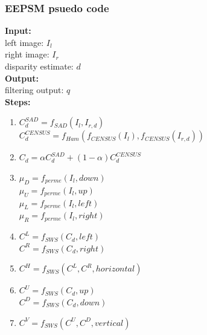\subsubsection*{EEPSM psuedo code}
\textbf{Input:} \\
left image: $I_l$\\
right image: $I_r$\\
disparity estimate: $d$\\
\textbf{Output:} \\
filtering output: $q$\\
\textbf{Steps:}
\begin{enumerate}
  \item $C^{SAD}_d = f_{SAD}(I_l,I_{r,d})$\\
           $C^{CENSUS}_d = f_{Ham}(f_{CENSUS}(I_l),f_{CENSUS}(I_{r,d}))$
  \item $C_d = \alpha C^{SAD}_d + (1-\alpha) C^{CENSUS}_d$
  \item $\mu_D = f_{perme}(I_l,down)$ \\
           $\mu_U = f_{perme}(I_l,up)$ \\
           $\mu_L = f_{perme}(I_l,left)$ \\
           $\mu_R = f_{perme}(I_l,right)$
  \item $C^L = f_{SWS}(C_d,left)$\\
           $C^R = f_{SWS}(C_d,right)$
  \item $C^H = f_{SWS}(C^L,C^R,horizontal)$
  \item $C^U = f_{SWS}(C_d,up)$\\
           $C^D = f_{SWS}(C_d,down)$
  \item $C^V = f_{SWS}(C^U,C^D,vertical)$  
\end{enumerate}

